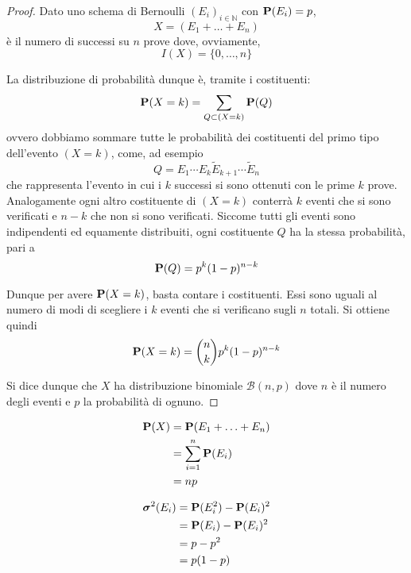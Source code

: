 \begin{proof}
  Dato uno schema di Bernoulli \( (E_i)_{i \in \mathbb{N}} \) con \( \mathbf{P}(E_i) = p \),
  \[ X = (E_1 + \ldots + E_n) \]
  è il numero di successi su \( n \) prove dove, ovviamente,
  \[ I(X) = \{0, \ldots, n\} \]
  
  La distribuzione di probabilità dunque è, tramite i costituenti:
  \[ \mathbf{P}(X = k) = \sum_{Q \subset (X = k)} \mathbf{P}(Q) \]
  ovvero dobbiamo sommare tutte le probabilità dei costituenti del primo tipo dell'evento \( (X = k) \), come, ad esempio
  \[ Q = E_1 \cdots E_k \tilde{E}_{k+1} \cdots \tilde{E}_n \]
  che rappresenta l'evento in cui i \( k \) successi si sono ottenuti con le prime \( k \) prove.
  Analogamente ogni altro costituente di \( (X = k) \) conterrà \( k \) eventi che si sono verificati e \( n-k \) che non si sono verificati.
  Siccome tutti gli eventi sono indipendenti ed equamente distribuiti, ogni costituente \( Q \) ha la stessa probabilità, pari a
  \[ \mathbf{P}(Q) = p^k (1-p)^{n-k} \]
  
  Dunque per avere \( \mathbf{P}(X = k) \), basta contare i costituenti.
  Essi sono uguali al numero di modi di scegliere i \( k \) eventi che si verificano sugli \( n \) totali. Si ottiene quindi
  \[ \mathbf{P}(X = k) = \binom{n}{k} p^k (1-p)^{n-k} \]

  Si dice dunque che \( X \) ha distribuzione binomiale \( \mathcal{B}(n, p) \) dove \( n \) è il numero degli eventi e \( p \) la probabilità di ognuno.
\end{proof}

\begin{proposition}
  \begin{align*}
    \mathbf{P}(X) &= \mathbf{P}(E_1 + \ldots + E_n) \\
    &= \sum_{i=1}^n \mathbf{P}(E_i) \\
    &= np
  \end{align*}
\end{proposition}

\begin{proposition}
  \begin{align*}
    \boldsymbol\sigma^2(E_i) &= \mathbf{P}(E_i^2) - \mathbf{P}(E_i)^2 \\
    &= \mathbf{P}(E_i) - \mathbf{P}(E_i)^2 \\
    &= p - p^2 \\
    &= p (1 - p)
  \end{align*}
\end{proposition}

